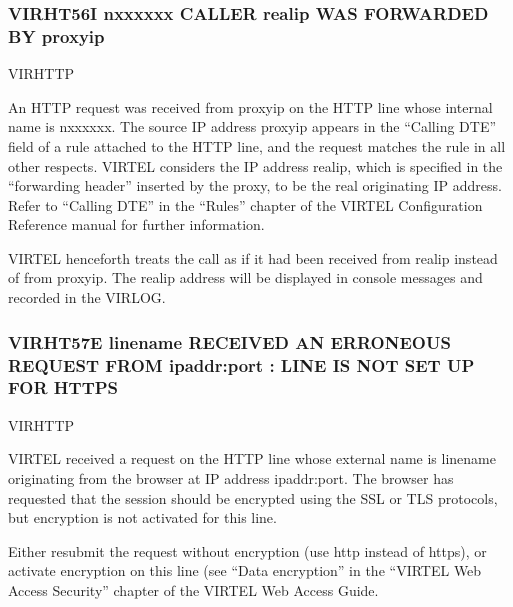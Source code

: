\documentclass[letterpaper,10pt,english]{sphinxmanual}
\begin{document}
\subsubsection{VIRHT56I n\sphinxhyphen{}xxxxxx CALLER real\sphinxhyphen{}ip WAS FORWARDED BY proxy\sphinxhyphen{}ip}
\label{\detokenize{messages:virht56i-n-xxxxxx-caller-real-ip-was-forwarded-by-proxy-ip}}\begin{description}
\sphinxAtStartPar
VIRHTTP

\sphinxAtStartPar
An HTTP request was received from proxy\sphinxhyphen{}ip on the HTTP line whose internal name is n\sphinxhyphen{}xxxxxx. The source IP address proxy\sphinxhyphen{}ip appears in the “Calling DTE” field of a rule attached to the HTTP line, and the request matches the rule in all other respects. VIRTEL considers the IP address real\sphinxhyphen{}ip, which is specified in the “forwarding header” inserted by the proxy, to be the real originating IP address. Refer to “Calling DTE” in the “Rules” chapter of the VIRTEL Configuration Reference manual for further information.

\sphinxAtStartPar
VIRTEL henceforth treats the call as if it had been received from real\sphinxhyphen{}ip instead of from proxy\sphinxhyphen{}ip. The real\sphinxhyphen{}ip address will be displayed in console messages and recorded in the VIRLOG.

\end{description}


\subsubsection{VIRHT57E linename RECEIVED AN ERRONEOUS REQUEST FROM ipaddr:port : LINE IS NOT SET UP FOR HTTPS}
\label{\detokenize{messages:virht57e-linename-received-an-erroneous-request-from-ipaddr-port-line-is-not-set-up-for-https}}\begin{description}
\sphinxAtStartPar
VIRHTTP

\sphinxAtStartPar
VIRTEL received a request on the HTTP line whose external name is linename originating from the browser at IP address ipaddr:port. The browser has requested that the session should be encrypted using the SSL or TLS protocols, but encryption is not activated for this line.

\sphinxAtStartPar
Either resubmit the request without encryption (use http instead of https), or activate encryption on this line (see “Data encryption” in the “VIRTEL Web Access Security” chapter of the VIRTEL Web Access Guide.

\end{description}
\end{document}
